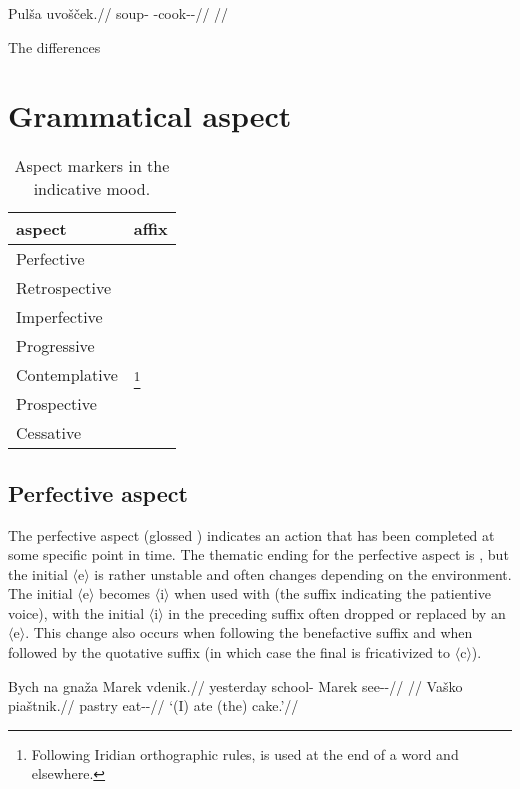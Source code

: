 \pex
\begingl
\gla Pulša uvošček.//
\glb soup-\Pat{} \Refl{}-cook-\Av{}-\Pf{}//
\glft {}//
\endgl
\xe


\par The differences

\section{Grammatical aspect}
\begin{table}[h!]\small
	\caption{Aspect markers in the indicative mood.}
	\medskip
	\begin{tabu} to 0.5\textwidth{YY[0.5]}
		\toprule
		{\sc aspect}	& {\sc affix}\\
		\midrule
		Perfective		& \\
		Retrospective	& \\
		Imperfective	& \\
		Progressive		&  \\
		Contemplative	& \footnote{Following Iridian orthographic rules,  is used at the end of a word and  elsewhere.}\\
		Prospective		& \\
		Cessative		& \\
		\bottomrule
	\end{tabu}

\end{table}
\subsection{Perfective aspect}
The perfective aspect (glossed \Pf{}) indicates an action that has been completed at some specific point in time. The thematic ending for the perfective aspect is , but the initial $\langle$e$\rangle$ is rather unstable and often changes depending on the environment. The initial $\langle$e$\rangle$ becomes $\langle$i$\rangle$ when used with  (the suffix indicating the patientive voice), with the initial $\langle$i$\rangle$ in the preceding suffix often dropped or replaced by an $\langle$e$\rangle$. This change also occurs when following the benefactive suffix  and when followed by the quotative suffix  (in which case the final  is fricativized to $\langle$c$\rangle$).

\pex
\a\begingl
\gla Bych na gnaža Marek vdenik.//
\glb yesterday \Loc{} school-\Pat{} Marek see-\Pv{}-\Pf{}//
\glft {}//
\endgl
\a\begingl
\gla Vaško piaštnik.//
\glb pastry eat-\Pv{}-\Pf{}//
\glft `(I) ate (the) cake.'//
\endgl
\xe


